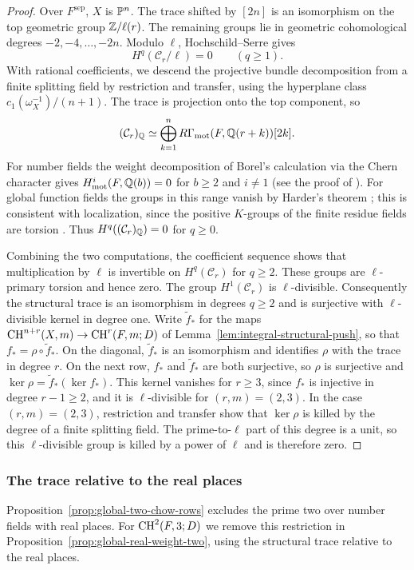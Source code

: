 \begin{proof}
Over $F^{\mathrm{sep}}$, $X$ is $\mathbb P^n$.
The trace shifted by $[2n]$ is an isomorphism on the top geometric group $\mathbb Z/\ell(r)$.
The remaining groups lie in geometric cohomological degrees $-2,-4,\ldots,-2n$.
Modulo $\ell$, Hochschild--Serre gives
\[
 H^q(\mathcal C_r/\ell)=0\qquad(q\ge1).
\]
With rational coefficients, we descend the projective bundle decomposition from a finite splitting field by restriction and transfer, using the hyperplane class $c_1(\omega_X^{-1})/(n+1)$.
The trace is projection onto the top component, so
\[
 (\mathcal C_r)_\mathbb Q\simeq
 \bigoplus_{k=1}^{n}R\Gamma_{\mathrm{mot}}(F,\mathbb Q(r+k))[2k].
\]
For number fields the weight decomposition of Borel's calculation \cite{Borel} via the Chern character gives $H^i_{\mathrm{mot}}(F,\mathbb Q(b))=0$ for $b\ge2$ and $i\ne1$ (see the proof of \cite[Theorem 3.2]{Scholbach2011}).
For global function fields the groups in this range vanish by Harder's theorem \cite{Harder}; this is consistent with localization, since the positive $K$-groups of the finite residue fields are torsion \cite{QuillenFinite}.
Thus $H^q((\mathcal C_r)_\mathbb Q)=0$ for $q\ge0$.

Combining the two computations, the coefficient sequence shows that multiplication by $\ell$ is invertible on $H^q(\mathcal C_r)$ for $q\ge2$.
These groups are $\ell$-primary torsion and hence zero.
The group $H^1(\mathcal C_r)$ is $\ell$-divisible.
Consequently the structural trace is an isomorphism in degrees $q\ge2$ and is surjective with $\ell$-divisible kernel in degree one.
Write $\widetilde f_*$ for the maps $\operatorname{CH}^{n+r}(X,m)\to\operatorname{CH}^r(F,m;D)$ of Lemma~\ref{lem:integral-structural-push}, so that $f_*=\rho\circ\widetilde f_*$.
On the diagonal, $\widetilde f_*$ is an isomorphism and identifies $\rho$ with the trace in degree $r$.
On the next row, $f_*$ and $\widetilde f_*$ are both surjective, so $\rho$ is surjective and $\ker\rho=\widetilde f_*(\ker f_*)$.
This kernel vanishes for $r\ge3$, since $f_*$ is injective in degree $r-1\ge2$, and it is $\ell$-divisible for $(r,m)=(2,3)$.
In the case $(r,m)=(2,3)$, restriction and transfer show that $\ker\rho$ is killed by the degree of a finite splitting field.
The prime-to-$\ell$ part of this degree is a unit, so this $\ell$-divisible group is killed by a power of $\ell$ and is therefore zero.
\end{proof}

\subsubsection{The trace relative to the real places}
Proposition~\ref{prop:global-two-chow-rows} excludes the prime two over number fields with real places.
For $\operatorname{CH}^2(F,3;D)$ we remove this restriction in Proposition~\ref{prop:global-real-weight-two}, using the structural trace relative to the real places.

